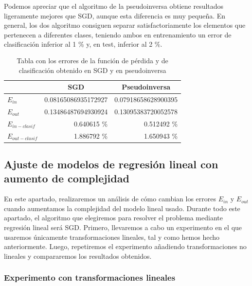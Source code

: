 \documentclass[10pt,a4paper]{article}
\begin{document}
Podemos apreciar que el algoritmo de la pseudoinversa obtiene resultados ligeramente mejores que SGD, aunque esta diferencia es muy pequeña. En general, los dos algoritmo consiguen separar satisfactoriamente los elementos que pertenecen a diferentes clases, teniendo ambos en entrenamiento un error de clasificación inferior al 1 \% y, en test, inferior al 2 \%.

\begin{table}[]
	\centering
	\begin{tabular}{l|r|r|}
		\cline{2-3}
		& \multicolumn{1}{c|}{SGD} & \multicolumn{1}{c|}{Pseudoinversa} \\ \hline
		\multicolumn{1}{|l|}{$E_{in}$}         & 0.08165086935172927      & 0.07918658628900395                \\ \hline
		\multicolumn{1}{|l|}{$E_{out}$}        & 0.13486487694930924      & 0.13095383720052578                \\ \hline
		\multicolumn{1}{|l|}{$E_{in-clasif}$}  & 0.640615 \%              & 0.512492 \%                        \\ \hline
		\multicolumn{1}{|l|}{$E_{out-clasif}$} & 1.886792 \%              & 1.650943 \%                        \\ \hline
	\end{tabular}
	\caption{Tabla con los errores de la función de pérdida y de clasificación obtenido en SGD y en pseudoinversa}
	\label{fig:ej2.1_errores}
\end{table}



\subsection{Ajuste de modelos de regresión lineal con aumento de complejidad}

En este apartado, realizaremos un análisis de cómo cambian los errores $E_{in}$ y $E_{out}$ cuando aumentamos la complejidad del modelo lineal usado. Durante todo este apartado, el algoritmo que elegiremos para resolver el problema mediante regresión lineal será SGD. Primero, llevaremos a cabo un experimento en el que usaremos únicamente transformaciones lineales, tal y como hemos hecho anteriormente. Luego, repetiremos el experimento añadiendo transformaciones no lineales y compararemos los resultados obtenidos.

\subsubsection{Experimento con transformaciones lineales}
\end{document}
